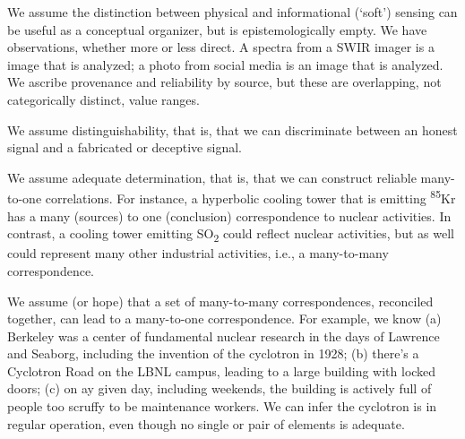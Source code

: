 \documentclass{article} %
\begin{document}
We assume the distinction between physical and informational (`soft') sensing can be useful as a conceptual organizer, but is epistemologically empty. We have observations, whether more or less direct. A spectra from a SWIR imager is a image that is analyzed; a photo from social media is an image that is analyzed. We ascribe provenance and reliability by source, but these are overlapping, not categorically distinct, value ranges.

We assume distinguishability, that is, that we can discriminate between an honest signal and a fabricated or deceptive signal. 

We assume adequate determination, that is, that we can construct reliable many-to-one correlations. For instance, a hyperbolic cooling tower that is emitting \textsuperscript{85}Kr has a many (sources) to one (conclusion) correspondence to nuclear activities. In contrast, a cooling tower emitting SO\textsubscript{2} could reflect nuclear activities, but as well could represent many other industrial activities, i.e., a many-to-many correspondence. 

We assume (or hope) that a set of many-to-many correspondences, reconciled together, can lead to a many-to-one correspondence. For example, we know (a) Berkeley was a center of fundamental nuclear research in the days of Lawrence and Seaborg, including the invention of the cyclotron in 1928; (b) there's a Cyclotron Road on the LBNL campus, leading to a large building with locked doors; (c) on ay given day, including weekends, the building is actively full of people too scruffy to be maintenance workers. We can infer the cyclotron is in regular operation, even though no single or pair of elements is adequate. 
\end{document}

